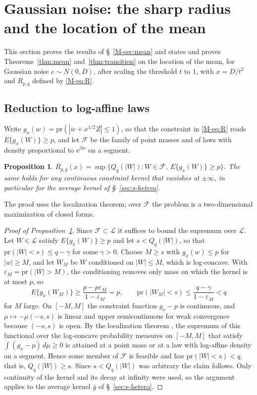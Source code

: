 \documentclass[11pt]{article}
\renewcommand{\_}{\usc\allowbreak}
\newtheorem{proposition}{Proposition}
\newcommand{\pr}{\mathrm{pr}}
\newcommand{\LC}{\mathcal{L}}
\begin{document}
\section{Gaussian noise: the sharp radius and the location of the mean}\label{sec:s-gauss}

This section proves the results of \S~\ref{M-sec:mean} and states and proves Theorems~\ref{thm:mean} and~\ref{thm:transition} on the location of the mean, for Gaussian noise $e \sim N(0, D)$, after scaling the threshold $t$ to $1$, with $x = D/t^2$ and $R_{p,q}$ defined by \eqref{M-eq:R}.

\subsection*{Reduction to log-affine laws}

Write $g_x(w) = \pr(|w + x^{1/2}Z| \le 1)$, so that the constraint in \eqref{M-eq:R} reads $E\{g_x(W)\} \ge p$, and let $\mathcal F$ be the family of point masses and of laws with density proportional to $\mathrm{e}^{\beta w}$ on a segment.

\begin{proposition}\label{prop:reduction}
$R_{p,q}(x) = \sup\{Q_q(|W|) : W \in \mathcal F,\ E\{g_x(W)\} \ge p\}$. The same holds for any continuous constraint kernel that vanishes at $\pm\infty$, in particular for the average kernel of \S~\ref{sec:s-hetero}.
\end{proposition}

The proof uses the localization theorem; over $\mathcal F$ the problem is a two-dimensional maximization of closed forms.

\begin{proof}[Proof of Proposition~\ref{prop:reduction}]
Since $\mathcal F \subset \LC$ it suffices to bound the supremum over $\LC$. Let $W \in \LC$ satisfy $E\{g_x(W)\} \ge p$ and let $s < Q_q(|W|)$, so that $\pr(|W| < s) \le q - \gamma$ for some $\gamma > 0$. Choose $M \ge s$ with $g_x(w) \le p$ for $|w| \ge M$, and let $W_M$ be $W$ conditioned on $|W| \le M$, which is log-concave. With $\varepsilon_M = \pr(|W| > M)$, the conditioning removes only mass on which the kernel is at most $p$, so
\[
E\{g_x(W_M)\} \ge \frac{p - p\varepsilon_M}{1 - \varepsilon_M} = p, \qquad \pr(|W_M| < s) \le \frac{q - \gamma}{1-\varepsilon_M} < q
\]
for $M$ large. On $[-M, M]$ the constraint function $g_x - p$ is continuous, and $\mu \mapsto -\mu(-s, s)$ is linear and upper semicontinuous for weak convergence because $(-s,s)$ is open. By the localization theorem \citep{kannan1995, fradelizi2004}, the supremum of this functional over the log-concave probability measures on $[-M, M]$ that satisfy $\int(g_x - p)\,d\mu \ge 0$ is attained at a point mass or at a law with log-affine density on a segment. Hence some member of $\mathcal F$ is feasible and has $\pr(|W| < s) < q$, that is, $Q_q(|W|) \ge s$. Since $s < Q_q(|W|)$ was arbitrary the claim follows. Only continuity of the kernel and its decay at infinity were used, so the argument applies to the average kernel $\bar g$ of \S~\ref{sec:s-hetero}.
\end{proof}
\end{document}
